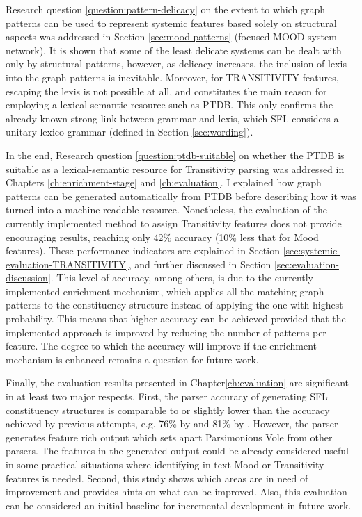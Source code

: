     Research question \ref{question:pattern-delicacy} on the extent to which graph patterns can be used to represent systemic features based solely on structural aspects was addressed in Section \ref{sec:mood-patterns} (focused MOOD system network). It is shown that some of the least delicate systems can be dealt with only by structural patterns, however, as delicacy increases, the inclusion of lexis into the graph patterns is inevitable. Moreover, for TRANSITIVITY features, escaping the lexis is not possible at all, and constitutes the main reason for employing a lexical-semantic resource such as PTDB. This only confirms the already known strong link between grammar and lexis, which SFL considers a unitary lexico-grammar (defined in Section \ref{sec:wording}).

    In the end, Research question \ref{question:ptdb-suitable} on whether the PTDB is suitable as a lexical-semantic resource for Transitivity parsing was addressed in Chapters \ref{ch:enrichment-stage} and \ref{ch:evaluation}. I explained how graph patterns can be generated automatically from PTDB before describing how it was turned into a machine readable resource. Nonetheless, the evaluation of the currently implemented method to assign Transitivity features does not provide encouraging results, reaching only 42\% accuracy (10\% less that for Mood features). These performance indicators are explained in Section \ref{sec:systemic-evaluation-TRANSITIVITY}, and further discussed in Section \ref{sec:evaluation-discussion}. This level of accuracy, among others, is due to the currently implemented enrichment mechanism, which applies all the matching graph patterns to the constituency structure instead of applying the one with highest probability. This means that higher accuracy can be achieved provided that the implemented approach is improved by reducing the number of patterns per feature. The degree to which the accuracy will improve if the enrichment mechanism is enhanced remains a question for future work. 
    
    Finally, the evaluation results presented in Chapter\ref{ch:evaluation} are significant in at least two major respects. First, the parser accuracy of generating SFL constituency structures is comparable to or slightly lower than the accuracy achieved by previous attempts, e.g. 76\% by \citet{Souter1996} and 81\% by \citet{ODonoghue91}. However, the parser generates feature rich output which sets apart Parsimonious Vole from other parsers. The features in the generated output could be already considered useful in some practical situations where identifying in text Mood or Transitivity features is needed.
    Second, this study shows which areas are in need of improvement and provides hints on what can be improved. Also, this evaluation can be considered an initial baseline for incremental development in future work.
    
